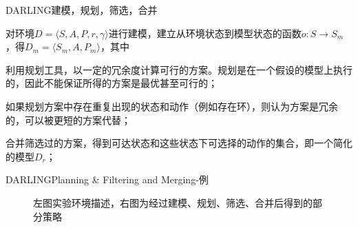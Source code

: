 \documentclass[10pt]{beamer}
\begin{document}
	\begin{frame}{DARLING}{建模，规划，筛选，合并}
		\begin{description}
			\item<2->[建模（Modeling）] 对环境$D=\langle S, A, P, r,\gamma \rangle$进行建模，建立从环境状态到模型状态的函数$o:S \rightarrow S_m$，得$D_m = \langle S_m, A, P_m \rangle$，其中
			\item<3->[规划（Planning）] 利用规划工具，以一定的冗余度计算可行的方案。规划是在一个假设的模型上执行的，因此不能保证所得的方案是最优甚至可行的；
			\item<4->[筛选（Filtering）] 如果规划方案中存在重复出现的状态和动作（例如存在环），则认为方案是冗余的，可以被更短的方案代替；
			\item<5->[合并（Merging）] 合并筛选过的方案，得到可达状态和这些状态下可选择的动作的集合，即一个简化的模型$D_r$；
		\end{description}
		
		\vspace{10pt}
	\end{frame}

	\begin{frame}{DARLING}{Planning \& Filtering and Merging-例}
		\begin{figure}
			\centering
			\caption{左图实验环境描述，右图为经过建模、规划、筛选、合并后得到的部分策略}
			\label{fig:grid-world}
		\end{figure}
	
	\end{frame}
\end{document}
